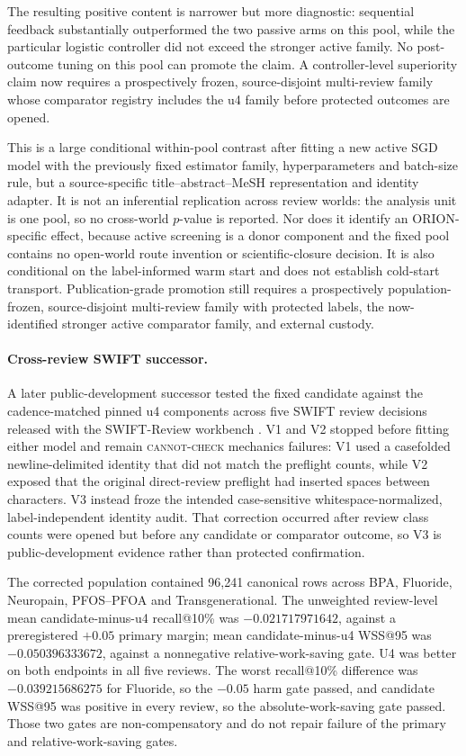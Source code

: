 The resulting positive content is narrower but more diagnostic: sequential
feedback substantially outperformed the two passive arms on this pool, while
the particular logistic controller did not exceed the stronger active family.
No post-outcome tuning on this pool can promote the claim. A controller-level
superiority claim now requires a prospectively frozen, source-disjoint
multi-review family whose comparator registry includes the u4 family before
protected outcomes are opened.

This is a large conditional within-pool contrast after fitting a new active
SGD model with the previously fixed estimator family, hyperparameters and
batch-size rule, but a source-specific
title--abstract--MeSH representation and identity adapter. It is not an
inferential replication across
review worlds: the analysis unit is one pool, so no cross-world $p$-value is
reported.  Nor does it identify an ORION-specific effect, because active
screening is a donor component and the fixed pool contains no open-world route
invention or scientific-closure decision. It is also conditional on the
label-informed warm start and does not establish cold-start transport.
Publication-grade promotion still
requires a prospectively population-frozen, source-disjoint multi-review family
with protected labels, the now-identified stronger active comparator family,
and external custody.

\paragraph{Cross-review SWIFT successor.}
A later public-development successor tested the fixed candidate against the
cadence-matched pinned u4 components across five SWIFT review decisions
released with the SWIFT-Review workbench \cite{howard2016swiftreview}.  V1
and V2 stopped before fitting either model and remain \textsc{cannot-check}
mechanics failures: V1 used a casefolded newline-delimited identity that did not
match the preflight counts, while V2 exposed that the original direct-review
preflight had inserted spaces between characters.  V3 instead froze the
intended case-sensitive whitespace-normalized, label-independent identity
audit.  That correction occurred after review class counts were opened but
before any candidate or comparator outcome, so V3 is public-development
evidence rather than protected confirmation.

The corrected population contained 96,241 canonical rows across BPA,
Fluoride, Neuropain, PFOS--PFOA and Transgenerational.  The unweighted
review-level mean candidate-minus-u4 recall@10\% was $-0.021717971642$, against
a preregistered $+0.05$ primary margin; mean candidate-minus-u4 WSS@95 was
$-0.050396333672$, against a nonnegative relative-work-saving gate.  U4 was
better on both endpoints in all five reviews.  The worst recall@10\% difference
was $-0.039215686275$ for Fluoride, so the $-0.05$ harm gate passed, and
candidate WSS@95 was positive in every review, so the absolute-work-saving gate
passed.  Those two gates are non-compensatory and do not repair failure of the
primary and relative-work-saving gates.

